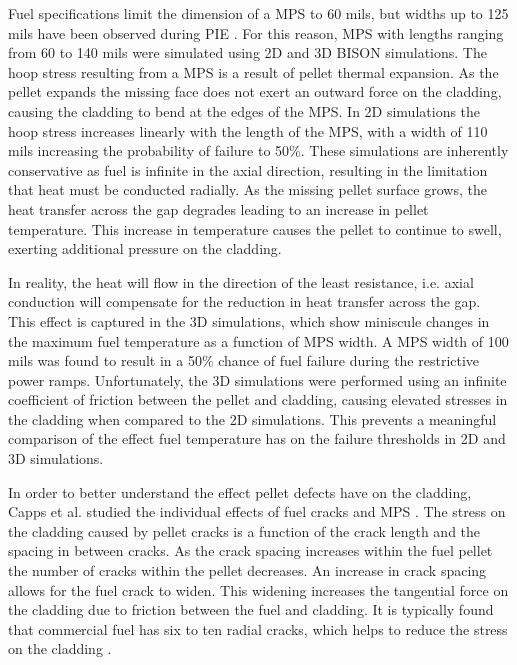\documentclass[edeposit,fullpage,11pt]{uiucthesis2009}
\begin{document}
Fuel specifications limit the dimension of a \gls{MPS} to 60 mils, but widths up to 125 mils have been observed during \gls{PIE} \cite{aleshin_effect_2010}.
For this reason, \gls{MPS} with lengths ranging from 60 to 140 mils were simulated using 2D and 3D BISON simulations. 
The hoop stress resulting from a \gls{MPS} is a result of pellet thermal expansion. 
As the pellet expands the missing face does not exert an outward force on the cladding, causing the cladding to bend at the edges of the \gls{MPS}.
In 2D simulations the hoop stress increases linearly with the length of the \gls{MPS}, with a width of 110 mils increasing the probability of failure to 50\%.
These simulations are inherently conservative as fuel is infinite in the axial direction, resulting in the limitation that heat must be conducted radially.
As the missing pellet surface grows, the heat transfer across the gap degrades leading to an increase in pellet temperature.
This increase in temperature causes the pellet to continue to swell, exerting additional pressure on the cladding.

In reality, the heat will flow in the direction of the least resistance, i.e. axial conduction will compensate for the reduction in heat transfer across the gap.
This effect is captured in the 3D simulations, which show miniscule changes in the maximum fuel temperature as a function of \gls{MPS} width.
A \gls{MPS} width of 100 mils was found to result in a 50\% chance of fuel failure during the restrictive power ramps.
Unfortunately, the 3D simulations were performed using an infinite coefficient of friction between the pellet and cladding, causing elevated stresses in the cladding when compared to the 2D simulations.
This prevents a meaningful comparison of the effect fuel temperature has on the failure thresholds in 2D and 3D simulations.


In order to better understand the effect pellet defects have on the cladding, Capps et al. studied the individual effects of fuel cracks and \gls{MPS} \cite{capps_evaluation_2016}.
The stress on the cladding caused by pellet cracks is a function of the crack length and the spacing in between cracks.
As the crack spacing increases within the fuel pellet the number of cracks within the pellet decreases.
An increase in crack spacing allows for the fuel crack to widen.
This widening increases the tangential force on the cladding due to friction between the fuel and cladding.
It is typically found that commercial fuel has six to ten radial cracks, which helps to reduce the stress on the cladding \cite{oguma_cracking_1983}. 
\end{document}
